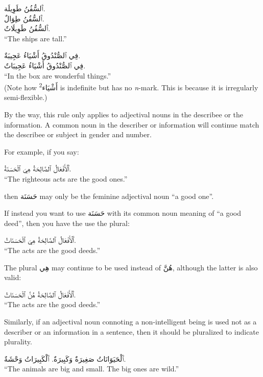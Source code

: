 \documentclass[
  10pt,
]{book}
\begin{document}
\foreignlanguage{arabic}{ٱَلسُّفُنُ طَوِيلَة.}\\
\foreignlanguage{arabic}{ٱَلسُّفُنُ طِوَالٌ.}\\
\foreignlanguage{arabic}{ٱَلسُّفُنُ طَوِيلَاتٌ.}\\
\enquote{The ships are tall.}

\foreignlanguage{arabic}{فِي ٱلصُّنْدُوقُ أَشْيَاءُ عَجِيبَةٌ.}\\
\foreignlanguage{arabic}{فِي ٱلصُّنْدُوقُ أَشْيَاءُ عَجِيبَاتٌ.}\\
\enquote{In the box are wonderful things.}\\
(Note how \textsuperscript{2}\foreignlanguage{arabic}{أَشْيَاء} is indefinite but has no \emph{n}-mark. This is because it is irregularly semi-flexible.)

By the way, this rule only applies to adjectival nouns in the describee or the information. A common noun in the describer or information will continue match the describee or subject in gender and number.

For example, if you say:

\foreignlanguage{arabic}{ٱَلْأَفْعَالُ ٱلصَّالِحَةُ هِيَ ٱلْحَسَنَةُ.}\\
\enquote{The righteous acts are the good ones.}

then \foreignlanguage{arabic}{حَسَنَة} may only be the feminine adjectival noun \enquote{a good one}.

If instead you want to use \foreignlanguage{arabic}{حَسَنَة} with its common noun meaning of \enquote{a good deed}, then you have the use the plural:

\foreignlanguage{arabic}{ٱَلْأَفْعَالُ ٱلصَّالِحَةُ هِيَ ٱلْحَسَنَاتُ.}\\
\enquote{The acts are the good deeds.}

The plural \foreignlanguage{arabic}{هِي} may continue to be used instead of \foreignlanguage{arabic}{هُنَّ}, although the latter is also valid:

\foreignlanguage{arabic}{ٱَلْأَفْعَالُ ٱلصَّالِحَةُ هُنَّ ٱلْحَسَنَاتُ.}\\
\enquote{The acts are the good deeds.}

Similarly, if an adjectival noun connoting a non-intelligent being is used not as a describer or an information in a sentence, then it should be pluralized to indicate plurality.

\foreignlanguage{arabic}{ٱَلْحَيَوَانَاتُ صَغِيرَةٌ وَکَبِيرَةٌ. ٱَلْکَبِيرَاتُ وَحْشَةٌ.}\\
\enquote{The animals are big and small. The big ones are wild.}
\end{document}
